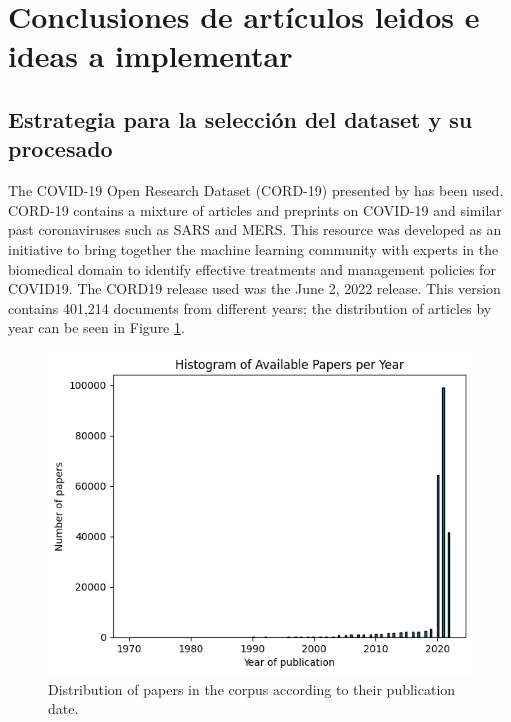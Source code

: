 \documentclass[a4paper,10pt]{article}
\title{}
\author{}
\begin{document}
\maketitle

\begin{abstract}

\end{abstract}

\section{Conclusiones de artículos leidos e ideas a implementar}

\subsection{Estrategia para la selección del dataset y su procesado}

The COVID-19 Open Research Dataset (CORD-19) presented by \cite{CORD19} has been used. CORD-19 contains a mixture of articles and preprints on COVID-19 and similar past coronaviruses such as SARS and MERS. This resource was developed as an initiative to bring together the machine learning community with experts in the biomedical domain to identify effective treatments and management policies for COVID19. The CORD19 release used was the June 2, 2022 release. This version contains 401,214 documents from different years; the distribution of articles by year can be seen in Figure \ref{fig:Histogram_Available_Papers_Year}.

\begin{figure}[H]
    \centering
    \includegraphics[width=0.8\linewidth]{fig/Histogram_Available_Papers_Year.png}
    \caption{\centering Distribution of papers in the corpus according to their publication date.}
    \label{fig:Histogram_Available_Papers_Year}
\end{figure}
\end{document}
